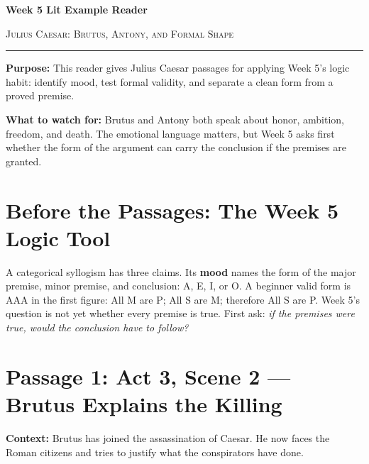 \documentclass[12pt]{article}
\begin{document}
\begin{center}
{\LARGE\bfseries Week 5 Lit Example Reader}\par\vspace{0.05em}
{\large\scshape Julius Caesar: Brutus, Antony, and Formal Shape}\par\vspace{0.15em}
\rule{0.78\textwidth}{0.5pt}
\end{center}

\textbf{Purpose:} This reader gives Julius Caesar passages for applying Week 5's logic habit: identify mood, test formal validity, and separate a clean form from a proved premise.

\textbf{What to watch for:} Brutus and Antony both speak about honor, ambition, freedom, and death. The emotional language matters, but Week 5 asks first whether the form of the argument can carry the conclusion if the premises are granted.

\section*{Before the Passages: The Week 5 Logic Tool}

A categorical syllogism has three claims. Its \textbf{mood} names the form of the major premise, minor premise, and conclusion: A, E, I, or O. A beginner valid form is AAA in the first figure: All M are P; All S are M; therefore All S are P. Week 5's question is not yet whether every premise is true. First ask: \textit{if the premises were true, would the conclusion have to follow?}

\section*{Passage 1: Act 3, Scene 2 --- Brutus Explains the Killing}

\textbf{Context:} Brutus has joined the assassination of Caesar. He now faces the Roman citizens and tries to justify what the conspirators have done.
\end{document}
